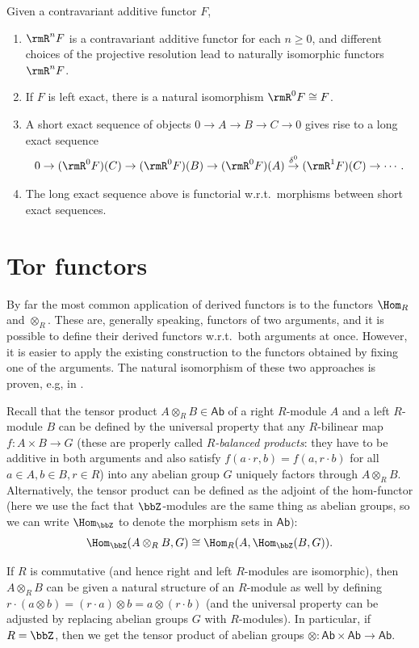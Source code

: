 \begin{thm}
    Given a contravariant additive functor $F$, 
    \begin{enumerate}
        \item $\rmR^nF$ is a contravariant additive functor for each $n\geq 0$, and different choices of the projective resolution lead to naturally isomorphic functors $\rmR^nF$.
        \item If $F$ is left exact, there is a natural isomorphism $\rmR^0F\cong F$.
        \item A short exact sequence of objects $0\to A\to B\to C\to 0$ gives rise to a long exact sequence
        \[0\to (\rmR^0F)(C)\to (\rmR^0F)(B)\to (\rmR^0F)(A)\overset{\delta^0}{\to} (\rmR^1F)(C)\to \cdots.\]
        \item The long exact sequence above is functorial w.r.t.\ morphisms between short exact sequences.
    \end{enumerate}
\end{thm}




\section{Tor functors}

By far the most common application of derived functors is to the functors $\Hom_R$ and $\otimes_R$. These are, generally speaking, functors of two arguments, and it is possible to define their derived functors w.r.t.\ both arguments at once. However, it is easier to apply the existing construction to the functors obtained by fixing one of the arguments. The natural isomorphism of these two approaches is proven, e.g, in \cite{Rotman}.

Recall that the tensor product $A\otimes_R B \in \mathsf{Ab}$ of a right $R$-module $A$ and a left $R$-module $B$ can be defined by the universal property that any $R$-bilinear map $f:A\times B\to G$ (these are properly called \emph{$R$-balanced products}: they have to be additive in both arguments and also satisfy $f(a\cdot r,b)=f(a,r\cdot b)$ for all $a\in A,b\in B,r\in R$) into any abelian group $G$ uniquely factors through $A\otimes_R B$. Alternatively, the tensor product can be defined as the adjoint of the hom-functor (here we use the fact that $\bbZ$-modules are the same thing as abelian groups, so we can write $\Hom_\bbZ$ to denote the morphism sets in $\mathsf{Ab})$:
\[\Hom_\bbZ(A\otimes_R B,G)\cong \Hom_R(A,\Hom_\bbZ(B,G)).\]

If $R$ is commutative (and hence right and left $R$-modules are isomorphic), then $A\otimes_R B$ can be given a natural structure of an $R$-module as well by defining $r\cdot(a\otimes b)=(r\cdot a)\otimes b=a\otimes (r\cdot b)$ (and the universal property can be adjusted by replacing abelian groups $G$ with $R$-modules).  In particular, if $R=\bbZ$, then we get the tensor product of abelian groups $\otimes:\mathsf{Ab}\times \mathsf{Ab}\to \mathsf{Ab}$.

